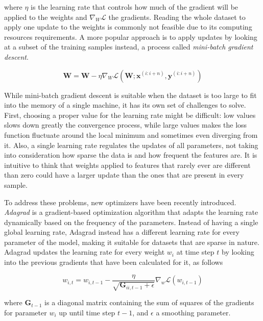 \documentclass{kththesis}
\begin{document}
where $\eta$ is the learning rate that controls how much of the gradient will be applied to the weights and $\nabla_W \mathcal{L}$ the gradients. Reading the whole dataset to apply one update to the weights is commonly not feasible due to its computing resources requirements. A more popular approach is to apply updates by looking at a subset of the training samples instead, a process  called \emph{mini-batch gradient descent}.

\begin{equation}
\mathbf{W} = \mathbf{W} - \eta \nabla_W \mathcal{L}(\mathbf{W}; \mathbf{x}^{(i:i+n)},\mathbf{y}^{(i:i+n)}) 
\end{equation}

While mini-batch gradient descent is suitable when the dataset is too large to fit into the memory of a single machine, it has its own set of challenges to solve. First, choosing a proper value for the learning rate might be difficult: low values slows down greatly the convergence process, while large values makes the loss function fluctuate around the local minimum and sometimes even diverging from it. Also, a single learning rate regulates the updates of all parameters, not taking into consideration how sparse the data is and how frequent the features are. It is intuitive to think that weights applied to features that rarely ever are different than zero could have a larger update than the ones that are present in every sample.

To address these problems, new optimizers have been recently introduced. \emph{Adagrad} \citep{duchi2011adaptive} is a gradient-based optimization algorithm that adapts the learning rate dynamically based on the frequency of the parameters. Instead of having a single global learning rate, Adagrad instead has a different learning rate for every parameter of the model, making it suitable for datasets that are sparse in nature. Adagrad updates the learning rate for every weight $w_i$ at time step $t$ by looking into the previous gradients that have been calculated for it, as follows

\begin{equation}
w_{i,t} = w_{i,t-1} - \frac{\eta}{\sqrt{\mathbf{G}_{ii, t-1} + \epsilon}} \nabla_w \mathcal{L}(w_{i,t-1})
\end{equation}

where $\mathbf{G}_{t-1}$ is a diagonal matrix containing the sum of squares of the gradients for parameter $w_i$ up until time step $t-1$, and $\epsilon$ a smoothing parameter.
\end{document}
